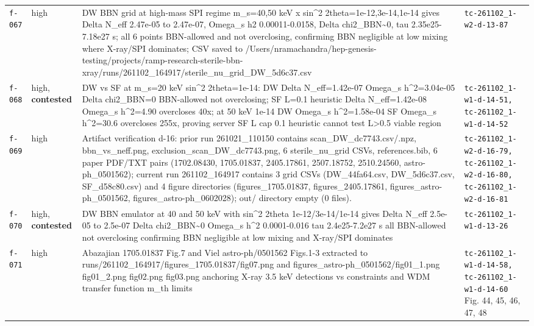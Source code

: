 \documentclass[11pt,a4paper]{article}
\begin{document}
\begin{longtable}{@{}p{}p{}p{}p{}@{}}
\texttt{f-067} & high & DW BBN grid at high-mass SPI regime m\_s=40,50 keV x sin\textasciicircum{}2 2theta=1e-12,3e-14,1e-14 gives Delta N\_eff 2.47e-05 to 2.47e-07, Omega\_s h2 0.00011-0.0158, Delta chi2\_BBN\textasciitilde{}0, tau 2.35e25-7.18e27 s; all 6 points BBN-allowed and not overclosing, confirming BBN negligible at low mixing where X-ray/SPI dominates; CSV saved to /Users/nramachandra/hep-genesis-testing/projects/ramp-research-sterile-bbn-xray/runs/261102\_164917/sterile\_nu\_grid\_DW\_5d6c37.csv & \texttt{tc-261102\_\allowbreak{}1-w2-d-13-87} \\
\texttt{f-068} & high, \textbf{contested} & DW vs SF at m\_s=20 keV sin\textasciicircum{}2 2theta=1e-14: DW Delta N\_eff=1.42e-07 Omega\_s h\textasciicircum{}2=3.04e-05 Delta chi2\_BBN=0 BBN-allowed not overclosing; SF L=0.1 heuristic Delta N\_eff=1.42e-08 Omega\_s h\textasciicircum{}2=4.90 overcloses 40x; at 50 keV 1e-14 DW Omega\_s h\textasciicircum{}2=1.58e-04 SF Omega\_s h\textasciicircum{}2=30.6 overcloses 255x, proving server SF L cap 0.1 heuristic cannot test L\textgreater{}0.5 viable region & \texttt{tc-261102\_\allowbreak{}1-w1-d-14-51,\allowbreak{} tc-261102\_\allowbreak{}1-w1-d-14-52} \\
\texttt{f-069} & high & Artifact verification d-16: prior run 261021\_110150 contains scan\_DW\_dc7743.csv/.npz, bbn\_vs\_neff.png, exclusion\_scan\_DW\_dc7743.png, 6 sterile\_nu\_grid CSVs, references.bib, 6 paper PDF/TXT pairs (1702.08430, 1705.01837, 2405.17861, 2507.18752, 2510.24560, astro-ph\_0501562); current run 261102\_164917 contains 3 grid CSVs (DW\_44fa64.csv, DW\_5d6c37.csv, SF\_d58c80.csv) and 4 figure directories (figures\_1705.01837, figures\_2405.17861, figures\_astro-ph\_0501562, figures\_astro-ph\_0602028); out/ directory empty (0 files). & \texttt{tc-261102\_\allowbreak{}1-w2-d-16-79,\allowbreak{} tc-261102\_\allowbreak{}1-w2-d-16-80,\allowbreak{} tc-261102\_\allowbreak{}1-w2-d-16-81} \\
\texttt{f-070} & high, \textbf{contested} & DW BBN emulator at 40 and 50 keV with sin\textasciicircum{}2 2theta 1e-12/3e-14/1e-14 gives Delta N\_eff 2.5e-05 to 2.5e-07 Delta chi2\_BBN\textasciitilde{}0 Omega\_s h\textasciicircum{}2 0.0001-0.016 tau 2.4e25-7.2e27 s all BBN-allowed not overclosing confirming BBN negligible at low mixing and X-ray/SPI dominates & \texttt{tc-261102\_\allowbreak{}1-w1-d-13-26} \\
\texttt{f-071} & high & Abazajian 1705.01837 Fig.7 and Viel astro-ph/0501562 Figs.1-3 extracted to runs/261102\_164917/figures\_1705.01837/fig07.png and figures\_astro-ph\_0501562/fig01\_1.png fig01\_2.png fig02.png fig03.png anchoring X-ray 3.5 keV detections vs constraints and WDM transfer function m\_th limits & \texttt{tc-261102\_\allowbreak{}1-w1-d-14-58,\allowbreak{} tc-261102\_\allowbreak{}1-w1-d-14-60} Fig. 44, 45, 46, 47, 48 \\

\end{longtable}
\end{document}
